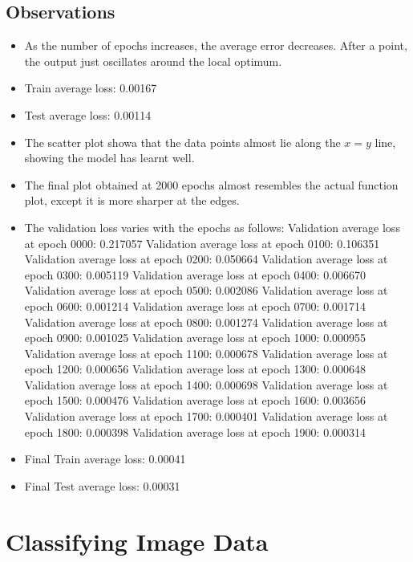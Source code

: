 \documentclass{article}
\begin{document}
\subsection{Observations}
\begin{itemize}
    \item As the number of epochs increases, the average error decreases. After a point, the output just oscillates around the local optimum.
    \item Train average loss: 0.00167
    \item Test average loss: 0.00114
    \item The scatter plot showa that the data points almost lie along the $x=y$ line, showing the model has learnt well.
    \item The final plot obtained at 2000 epochs almost resembles the actual function plot, except it is more sharper at the edges.
    \item The validation loss varies with the epochs as follows:
    \subitem Validation average loss at epoch 0000: 0.217057
    \subitem Validation average loss at epoch 0100: 0.106351
	\subitem Validation average loss at epoch 0200: 0.050664
	\subitem Validation average loss at epoch 0300: 0.005119
	\subitem Validation average loss at epoch 0400: 0.006670
	\subitem Validation average loss at epoch 0500: 0.002086
	\subitem Validation average loss at epoch 0600: 0.001214
	\subitem Validation average loss at epoch 0700: 0.001714
	\subitem Validation average loss at epoch 0800: 0.001274
	\subitem Validation average loss at epoch 0900: 0.001025
	\subitem Validation average loss at epoch 1000: 0.000955
	\subitem Validation average loss at epoch 1100: 0.000678
	\subitem Validation average loss at epoch 1200: 0.000656
	\subitem Validation average loss at epoch 1300: 0.000648
	\subitem Validation average loss at epoch 1400: 0.000698
	\subitem Validation average loss at epoch 1500: 0.000476
	\subitem Validation average loss at epoch 1600: 0.003656
	\subitem Validation average loss at epoch 1700: 0.000401
	\subitem Validation average loss at epoch 1800: 0.000398
	\subitem Validation average loss at epoch 1900: 0.000314
	\item Final Train average loss: 0.00041
	\item Final Test average loss: 0.00031
\end{itemize}


\section{Classifying Image Data}
\end{document}
